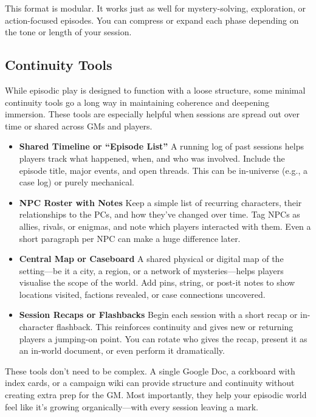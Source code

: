 This format is modular. It works just as well for mystery-solving, exploration, or action-focused episodes. You can compress or expand each phase depending on the tone or length of your session.

\subsection*{Continuity Tools}

While episodic play is designed to function with a loose structure, some minimal continuity tools go a long way in maintaining coherence and deepening immersion. These tools are especially helpful when sessions are spread out over time or shared across GMs and players.

\begin{itemize}
    \item \textbf{Shared Timeline or “Episode List”}  
    A running log of past sessions helps players track what happened, when, and who was involved. Include the episode title, major events, and open threads. This can be in-universe (e.g., a case log) or purely mechanical.

    \item \textbf{NPC Roster with Notes}  
    Keep a simple list of recurring characters, their relationships to the PCs, and how they’ve changed over time. Tag NPCs as allies, rivals, or enigmas, and note which players interacted with them. Even a short paragraph per NPC can make a huge difference later.

    \item \textbf{Central Map or Caseboard}  
    A shared physical or digital map of the setting—be it a city, a region, or a network of mysteries—helps players visualise the scope of the world. Add pins, string, or post-it notes to show locations visited, factions revealed, or case connections uncovered.

    \item \textbf{Session Recaps or Flashbacks}  
    Begin each session with a short recap or in-character flashback. This reinforces continuity and gives new or returning players a jumping-on point. You can rotate who gives the recap, present it as an in-world document, or even perform it dramatically.
\end{itemize}

These tools don't need to be complex. A single Google Doc, a corkboard with index cards, or a campaign wiki can provide structure and continuity without creating extra prep for the GM. Most importantly, they help your episodic world feel like it’s growing organically—with every session leaving a mark.



